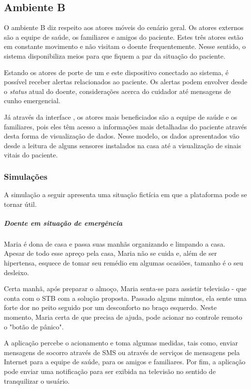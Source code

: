 \subsection{Ambiente B} \label{subsec:ambiente-b}

O ambiente B diz respeito aos atores móveis do cenário geral. Os atores externos
são a equipe de saúde, os familiares e amigos do paciente. Estes três atores
estão em constante movimento e não visitam o doente frequentemente. Nesse
sentido, o sistema disponibiliza meios para que fiquem a par da situação do
paciente.

Estando os atores de porte de um \smartphone[] e este dispositivo conectado ao
sistema, é possível receber alertas relacionados ao paciente. Os alertas podem
envolver desde o \textit{status} atual do doente, considerações acerca do
cuidador até mensagens de cunho emergencial.

Já através da interface \web[], os atores mais beneficiados são a equipe de
saúde e os familiares, pois eles têm acesso a informações mais detalhadas do
paciente através desta forma de visualização de dados. Nesse modelo, os dados
apresentados vão desde a leitura de alguns sensores instalados na casa até a
visualização de sinais vitais do paciente.

\subsubsection{Simulações}

A simulação a seguir apresenta uma situação fictícia em que a plataforma pode
se tornar útil.

\subparagraph{Doente em situação de emergência}

Maria é dona de casa e passa suas manhãs organizando e limpando a casa. Apesar
de todo esse apreço pela casa, Maria não se cuida e, além de ser hipertensa,
esquece de tomar seu remédio em algumas ocasiões, tamanho é o seu desleixo.

Certa manhã, após preparar o almoço, Maria senta-se para assistir televisão -
que conta com o STB com a solução proposta. Passado alguns minutos, ela sente
uma forte dor no peito seguido por um desconforto no braço esquerdo. Neste
momento, Maria certa de que precisa de ajuda, pode acionar no controle remoto o
"botão de pânico". 

A aplicação percebe o acionamento e toma algumas medidas, tais como, enviar
mensagens de socorro através de SMS ou através de serviços de mensagens pela
Internet para a equipe de saúde, para os amigos e familiares.  Por fim, a
aplicação pode enviar uma notificação para ser exibida na televisão no sentido
de tranquilizar o usuário.


